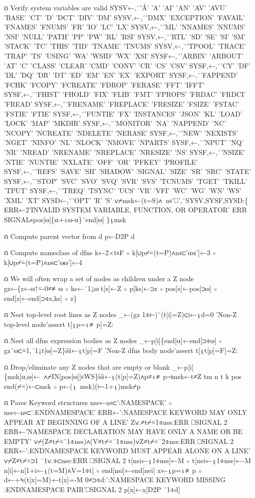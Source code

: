 \documentclass{article}%
\begin{document}
⍝ Verify system variables are valid
   SYSV←,¨'Á' 'A' 'AI' 'AN' 'AV' 'AVU' 'BASE' 'CT' 'D' 'DCT' 'DIV' 'DM'
   SYSV,←,¨'DMX' 'EXCEPTION' 'FAVAIL' 'FNAMES' 'FNUMS' 'FR' 'IO' 'LC' 'LX'
   SYSV,←,¨'ML' 'NNAMES' 'NNUMS' 'NSI' 'NULL' 'PATH' 'PP' 'PW' 'RL' 'RSI'
   SYSV,←,¨'RTL' 'SD' 'SE' 'SI' 'SM' 'STACK' 'TC' 'THIS' 'TID' 'TNAME' 'TNUMS'
   SYSV,←,¨'TPOOL' 'TRACE' 'TRAP' 'TS' 'USING' 'WA' 'WSID' 'WX' 'XSI'
   SYSF←,¨'ARBIN' 'ARBOUT' 'AT' 'C' 'CLASS' 'CLEAR' 'CMD' 'CONV' 'CR' 'CS' 'CSV'
   SYSF,←,¨'CY' 'DF' 'DL' 'DQ' 'DR' 'DT' 'ED' 'EM' 'EN' 'EX' 'EXPORT'
   SYSF,←,¨'FAPPEND' 'FCHK' 'FCOPY' 'FCREATE' 'FDROP' 'FERASE' 'FFT' 'IFFT'
   SYSF,←,¨'FHIST' 'FHOLD' 'FIX' 'FLIB' 'FMT' 'FPROPS' 'FRDAC' 'FRDCI' 'FREAD'
   SYSF,←,¨'FRENAME' 'FREPLACE' 'FRESIZE' 'FSIZE' 'FSTAC' 'FSTIE' 'FTIE'
   SYSF,←,¨'FUNTIE' 'FX' 'INSTANCES' 'JSON' 'KL' 'LOAD' 'LOCK' 'MAP' 'MKDIR'
   SYSF,←,¨'MONITOR' 'NA' 'NAPPEND' 'NC' 'NCOPY' 'NCREATE' 'NDELETE' 'NERASE'
   SYSF,←,¨'NEW' 'NEXISTS' 'NGET' 'NINFO' 'NL' 'NLOCK' 'NMOVE' 'NPARTS'
   SYSF,←,¨'NPUT' 'NQ' 'NR' 'NREAD' 'NRENAME' 'NREPLACE' 'NRESIZE' 'NS'
   SYSF,←,¨'NSIZE' 'NTIE' 'NUNTIE' 'NXLATE' 'OFF' 'OR' 'PFKEY' 'PROFILE'
   SYSF,←,¨'REFS' 'SAVE' 'SH' 'SHADOW' 'SIGNAL' 'SIZE' 'SR' 'SRC' 'STATE'
   SYSF,←,¨'STOP' 'SVC' 'SVO' 'SVQ' 'SVR' 'SVS' 'TCNUMS' 'TGET' 'TKILL' 'TPUT'
   SYSF,←,¨'TREQ' 'TSYNC' 'UCS' 'VR' 'VFI' 'WC' 'WG' 'WN' 'WS' 'XML' 'XT'
   SYSD←,¨'OPT' 'R' 'S'
   ∨⌿msk←(t=S)∧~n∊'⎕',¨SYSV,SYSF,SYSD:\{
     ERR←2'INVALID SYSTEM VARIABLE, FUNCTION, OR OPERATOR'
     ERR SIGNAL∊pos[⍵]\{⍺+⍳⍵-⍺\}¨end[⍵]
   \}⍸msk

⍝ Compute parent vector from d
   p←D2P d

⍝ Compute nameclass of dfns
   k←2×t∊F ⋄ k[∪p⌿⍨(t=P)∧n∊⊂'⍺⍺']←3 ⋄ k[∪p⌿⍨(t=P)∧n∊⊂'⍵⍵']←4

⍝ We will often wrap a set of nodes as children under a Z node
   gz←\{z←⍵↑⍨-0≠≢⍵ ⋄ ks←¯1↓⍵
     t[z]←Z ⋄ p[ks]←⊃z ⋄ pos[z]←pos[⊃⍵] ⋄ end[z]←end[⊃⌽z,ks] ⋄ z\}

⍝ Nest top-level root lines as Z nodes
   _←(gz 1⌽⊢)¨(t[i]=Z)⊂i←⍸d=0
   'Non-Z top-level node'assert t[⍸p=⍳≢p]=Z:

⍝ Nest all dfns expression bodies as Z nodes
   _←p[i]\{end[⍺]←end[⊃⌽⍵] ⋄ gz¨⍵⊂⍨1,¯1↓t[⍵]=Z\}⌸i←⍸t[p]=F
   'Non-Z dfns body node'assert t[⍸t[p]=F]=Z:

⍝ Drop/eliminate any Z nodes that are empty or blank
   _←p[i]\{msk[⍺,⍵]←~∧⌿IN[pos[⍵]]∊WS\}⌸i←⍸(t[p]=Z)∧p≠⍳≢p⊣msk←t≠Z
   tm n t k pos end(⌿⍨)←⊂msk ⋄ p←(⍸~msk)(⊢-1+⍸)msk⌿p

⍝ Parse Keyword structures
   nss←n∊⊂':NAMESPACE' ⋄ nse←n∊⊂':ENDNAMESPACE'
   ERR←':NAMESPACE KEYWORD MAY ONLY APPEAR AT BEGINNING OF A LINE'
   Z∨.≠t⌿⍨1⌽nss:ERR ⎕SIGNAL 2
   ERR←'NAMESPACE DECLARATION MAY HAVE ONLY A NAME OR BE EMPTY'
   ∨⌿(Z≠t⌿⍨¯1⌽nss)∧(V≠t⌿⍨¯1⌽nss)∨Z≠t⌿⍨¯2⌽nss:ERR ⎕SIGNAL 2
   ERR←':ENDNAMESPACE KEYWORD MUST APPEAR ALONE ON A LINE'
   ∨⌿Z≠t⌿⍨⊃1 ¯1∨.⌽⊂nse:ERR ⎕SIGNAL 2
   t[nsi←⍸1⌽nss]←M ⋄ t[nei←⍸1⌽nse]←-M
   n[i]←n[1+i←⍸(t=M)∧V=1⌽t] ⋄ end[nsi]←end[nei]
   x←⍸p=⍳≢p ⋄ d←+⍀(t[x]=M)+-t[x]=-M
   0≠⊃⌽d:':NAMESPACE KEYWORD MISSING :ENDNAMESPACE PAIR'⎕SIGNAL 2
   p[x]←x[D2P ¯1⌽d]
\end{document}
